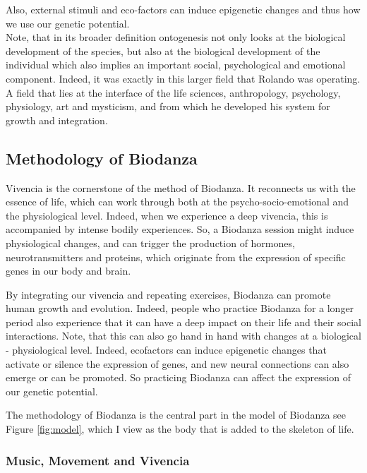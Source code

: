 \documentclass[
  11pt,
]{book}
\begin{document}
Also, external stimuli and eco-factors can induce epigenetic changes and thus how we use our genetic potential.\\

Note, that in its broader definition ontogenesis not only looks at the biological development of the species, but also at the biological development of the individual which also implies an important social, psychological and emotional component.
Indeed, it was exactly in this larger field that Rolando was operating. A field that lies at the interface of the life sciences, anthropology, psychology, physiology, art and mysticism, and from which he developed his system for growth and integration.

\hypertarget{methodology-of-biodanza}{%
\subsection{Methodology of Biodanza}\label{methodology-of-biodanza}}

Vivencia is the cornerstone of the method of Biodanza. It reconnects us with the essence of life, which can work through both at the psycho-socio-emotional and the physiological level. Indeed, when we experience a deep vivencia, this is accompanied by intense bodily experiences. So, a Biodanza session might induce physiological changes, and can trigger the production of hormones, neurotransmitters and proteins, which originate from the expression of specific genes in our body and brain.

By integrating our vivencia and repeating exercises, Biodanza can promote human growth and evolution. Indeed, people who practice Biodanza for a longer period also experience that it can have a deep impact on their life and their social interactions. Note, that this can also go hand in hand with changes at a biological - physiological level. Indeed, ecofactors can induce epigenetic changes that activate or silence the expression of genes, and new neural connections can also emerge or can be promoted. So practicing Biodanza can affect the expression of our genetic potential.

The methodology of Biodanza is the central part in the model of Biodanza see Figure \ref{fig:model}, which I view as the body that is added to the skeleton of life.

\hypertarget{music-movement-and-vivencia}{%
\subsubsection{Music, Movement and Vivencia}\label{music-movement-and-vivencia}}
\end{document}
